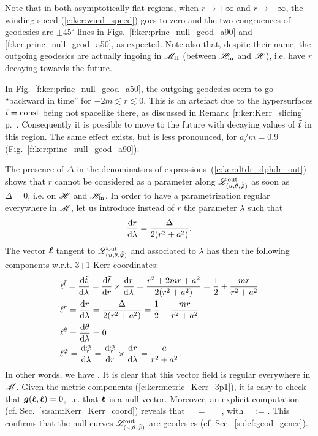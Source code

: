 Note that in both asymptotically flat regions, when $r\rightarrow +\infty$ and
$r\rightarrow -\infty$, the winding speed (\ref{e:ker:wind_speed}) goes to zero
and the two congruences of geodesics are $\pm 45^\circ$ lines
in Figs.~\ref{f:ker:princ_null_geod_a90} and
\ref{f:ker:princ_null_geod_a50}, as expected.
Note also that, despite their name, the outgoing geodesics are actually
ingoing in $\mathscr{M}_{\rm II}$ (between $\mathscr{H}_{\rm in}$ and $\mathscr{H}$), i.e. have $r$ decaying
towards the future.
\begin{remark}
In Fig.~\ref{f:ker:princ_null_geod_a50},
the outgoing geodesics seem to go ``backward in time'' for $-2m \lesssim r \lesssim 0$. This
is an artefact due to the hypersurfaces ${\tilde t} = \mathrm{const}$ being not spacelike
there, as discussed in Remark~\ref{r:ker:Kerr_slicing}
p.~\pageref{r:ker:Kerr_slicing}.
Consequently it is possible to move to the future with decaying values
of ${\tilde t}$ in this region.
The same effect exists, but is less pronounced, for $a/m=0.9$ (Fig.~\ref{f:ker:princ_null_geod_a90}).
\end{remark}

The presence of $\Delta$ in the denominators of expressions~(\ref{e:ker:dtdr_dphdr_out})
shows that $r$ cannot be considered as
a parameter along $\mathscr{L}^{\rm out}_{(u,\theta,\tilde{{\tilde\varphi}})}$ as soon as
$\Delta=0$, i.e. on $\mathscr{H}$ and $\mathscr{H}_{\rm in}$.
In order to have a parametrization regular everywhere in $\mathscr{M}$, let us introduce
instead of $r$
the parameter $\lambda$ such that
\[
    \frac{\mathrm{d} r}{\mathrm{d}\lambda} = \frac{\Delta}{2(r^2+a^2)} .
\]
The vector $\bm{\ell}$ tangent to $\mathscr{L}^{\rm out}_{(u,\theta,\tilde{{\tilde\varphi}})}$ and associated
to $\lambda$ has then the following components w.r.t. 3+1 Kerr coordinates:
\begin{align}
& \ell^{{\tilde t}} = \frac{\mathrm{d} {\tilde t}}{\mathrm{d}\lambda} = \frac{\mathrm{d} {\tilde t}}{\mathrm{d} r}\times\frac{\mathrm{d} r}{\mathrm{d}\lambda}
    = \frac{r^2 + 2m r + a^2}{2(r^2+a^2)} = \frac{1}{2} + \frac{m r}{r^2 + a^2} \nonumber \\
& \ell^{r} = \frac{\mathrm{d} r}{\mathrm{d}\lambda} = \frac{\Delta}{2(r^2+a^2)} = \frac{1}{2} - \frac{m r}{r^2 + a^2}\nonumber \\
& \ell^{\theta} = \frac{\mathrm{d} \theta}{\mathrm{d}\lambda} = 0 \nonumber\\
& \ell^{{\tilde\varphi}} = \frac{\mathrm{d} {\tilde\varphi}}{\mathrm{d}\lambda} = \frac{\mathrm{d} {\tilde\varphi}}{\mathrm{d} r}\times\frac{\mathrm{d} r}{\mathrm{d}\lambda}
    = \frac{a}{r^2+a^2} . \nonumber
\end{align}
In other words, we have
\be \label{e:ker:def_ell_outgoing}
     .
\ee
It is clear that this vector field is regular everywhere in $\mathscr{M}$.
Given the metric components (\ref{e:ker:metric_Kerr_3p1}), it is easy
to check that $\bm{g}(\bm{\ell},\bm{\ell})=0$, i.e. that $\bm{\ell}$ is a null vector.
Moreover, an explicit computation (cf. Sec.~\ref{s:sam:Kerr_Kerr_coord}) reveals that
\be \label{e:ker:pregeod_ell}
    \wnab_{\wl}\, \wl = \kappa_{\wl} \, \wl ,
\ee
with
\be \label{e:ker:bar_kappa}
    \kappa_{\wl} :=  .
\ee
This confirms that the null curves $\mathscr{L}^{\rm out}_{(u,\theta,\tilde{{\tilde\varphi}})}$ are
geodesics (cf. Sec.~\ref{s:def:geod_gener}).

